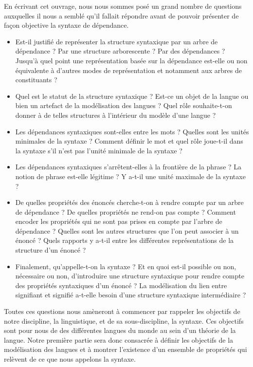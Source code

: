 En écrivant cet ouvrage, nous nous sommes posé un grand nombre de questions auxquelles il nous a semblé qu’il fallait répondre avant de pouvoir présenter de façon objective la syntaxe de dépendance.

\begin{itemize}
\item Est-il justifié de représenter la structure syntaxique par un arbre de dépendance ? Par une structure arborescente ? Par des dépendances ? Jusqu’à quel point une représentation basée sur la dépendance est-elle ou non équivalente à d’autres modes de représentation et notamment aux arbres de constituants ?
\item Quel est le statut de la structure syntaxique ? Est-ce un objet de la langue ou bien un artefact de la modélisation des langues ? Quel rôle souhaite-t-on donner à de telles structures à l’intérieur du modèle d’une langue ?
\item Les dépendances syntaxiques sont-elles entre les mots ? Quelles sont les unités minimales de la syntaxe ? Comment définir le mot et quel rôle joue-t-il dans la syntaxe s’il n’est pas l’unité minimale de la syntaxe ?
\item Les dépendances syntaxiques s’arrêtent-elles à la frontière de la phrase ? La notion de phrase est-elle légitime ? Y a-t-il une unité maximale de la syntaxe ?
\item De quelles propriétés des énoncés cherche-t-on à rendre compte par un arbre de dépendance ? De quelles propriétés ne rend-on pas compte ? Comment encoder les propriétés qui ne sont pas prises en compte par l’arbre de dépendance ? Quelles sont les autres structures que l’on peut associer à un énoncé ? Quels rapports y a-t-il entre les différentes représentations de la structure d’un énoncé ?
\item\sloppy Finalement, qu’appelle-t-on la syntaxe ? Et en quoi est-il possible ou non, nécessaire ou non, d’introduire une structure syntaxique pour rendre compte des propriétés syntaxiques d’un énoncé ? La modélisation du lien entre signifiant et signifié a-t-elle besoin d’une structure syntaxique intermédiaire ?
\end{itemize}

Toutes ces questions nous amèneront à commencer par rappeler les objectifs de notre discipline, la linguistique, et de sa sous-discipline, la syntaxe. Ces objectifs sont pour nous de  des différentes langues du monde au sein d’un théorie de la langue. Notre première partie sera donc consacrée à définir les objectifs de la modélisation des langues et à montrer l’existence d’un ensemble de propriétés qui relèvent de ce que nous appelons la syntaxe.

